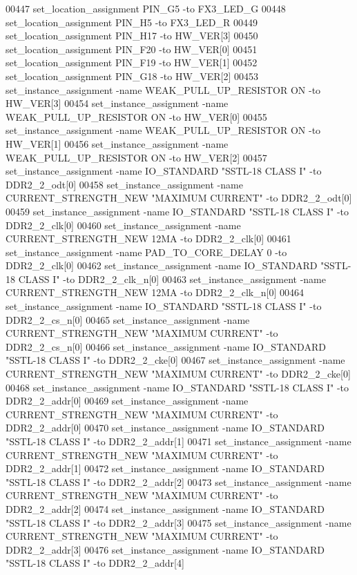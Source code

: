 \begin{DoxyCode}
00447 set\_location\_assignment PIN\_G5 -to FX3\_LED\_G
00448 set\_location\_assignment PIN\_H5 -to FX3\_LED\_R
00449 set\_location\_assignment PIN\_H17 -to HW\_VER[3]
00450 set\_location\_assignment PIN\_F20 -to HW\_VER[0]
00451 set\_location\_assignment PIN\_F19 -to HW\_VER[1]
00452 set\_location\_assignment PIN\_G18 -to HW\_VER[2]
00453 set\_instance\_assignment -name WEAK\_PULL\_UP\_RESISTOR \textcolor{keywordflow}{ON} -to HW\_VER[3]
00454 set\_instance\_assignment -name WEAK\_PULL\_UP\_RESISTOR \textcolor{keywordflow}{ON} -to HW\_VER[0]
00455 set\_instance\_assignment -name WEAK\_PULL\_UP\_RESISTOR \textcolor{keywordflow}{ON} -to HW\_VER[1]
00456 set\_instance\_assignment -name WEAK\_PULL\_UP\_RESISTOR \textcolor{keywordflow}{ON} -to HW\_VER[2]
00457 set\_instance\_assignment -name IO\_STANDARD "SSTL-18 CLASS I" -to DDR2\_2\_odt[0]
00458 set\_instance\_assignment -name CURRENT\_STRENGTH\_NEW "MAXIMUM CURRENT" -to DDR2\_2\_odt[0]
00459 set\_instance\_assignment -name IO\_STANDARD "SSTL-18 CLASS I" -to DDR2\_2\_clk[0]
00460 set\_instance\_assignment -name CURRENT\_STRENGTH\_NEW 12MA -to DDR2\_2\_clk[0]
00461 set\_instance\_assignment -name PAD\_TO\_CORE\_DELAY \textcolor{vhdllogic}{0} -to DDR2\_2\_clk[0]
00462 set\_instance\_assignment -name IO\_STANDARD "SSTL-18 CLASS I" -to DDR2\_2\_clk\_n[0]
00463 set\_instance\_assignment -name CURRENT\_STRENGTH\_NEW 12MA -to DDR2\_2\_clk\_n[0]
00464 set\_instance\_assignment -name IO\_STANDARD "SSTL-18 CLASS I" -to DDR2\_2\_cs\_n[0]
00465 set\_instance\_assignment -name CURRENT\_STRENGTH\_NEW "MAXIMUM CURRENT" -to DDR2\_2\_cs\_n[0]
00466 set\_instance\_assignment -name IO\_STANDARD "SSTL-18 CLASS I" -to DDR2\_2\_cke[0]
00467 set\_instance\_assignment -name CURRENT\_STRENGTH\_NEW "MAXIMUM CURRENT" -to DDR2\_2\_cke[0]
00468 set\_instance\_assignment -name IO\_STANDARD "SSTL-18 CLASS I" -to DDR2\_2\_addr[0]
00469 set\_instance\_assignment -name CURRENT\_STRENGTH\_NEW "MAXIMUM CURRENT" -to DDR2\_2\_addr[0]
00470 set\_instance\_assignment -name IO\_STANDARD "SSTL-18 CLASS I" -to DDR2\_2\_addr[1]
00471 set\_instance\_assignment -name CURRENT\_STRENGTH\_NEW "MAXIMUM CURRENT" -to DDR2\_2\_addr[1]
00472 set\_instance\_assignment -name IO\_STANDARD "SSTL-18 CLASS I" -to DDR2\_2\_addr[2]
00473 set\_instance\_assignment -name CURRENT\_STRENGTH\_NEW "MAXIMUM CURRENT" -to DDR2\_2\_addr[2]
00474 set\_instance\_assignment -name IO\_STANDARD "SSTL-18 CLASS I" -to DDR2\_2\_addr[3]
00475 set\_instance\_assignment -name CURRENT\_STRENGTH\_NEW "MAXIMUM CURRENT" -to DDR2\_2\_addr[3]
00476 set\_instance\_assignment -name IO\_STANDARD "SSTL-18 CLASS I" -to DDR2\_2\_addr[4]

\end{DoxyCode}
